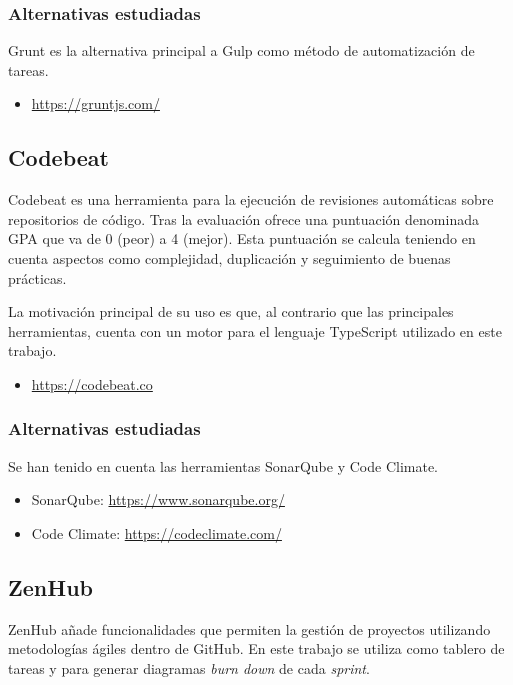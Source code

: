 \subsubsection{Alternativas estudiadas}

Grunt es la alternativa principal a Gulp como método de automatización de tareas.

\begin{itemize}
	\item \url{https://gruntjs.com/}
\end{itemize}

\subsection{Codebeat}

Codebeat es una herramienta para la ejecución de revisiones automáticas sobre repositorios de código. Tras la evaluación ofrece una puntuación denominada GPA que va de 0 (peor) a 4 (mejor). Esta puntuación se calcula teniendo en cuenta aspectos como complejidad, duplicación y seguimiento de buenas prácticas.

La motivación principal de su uso es que, al contrario que las principales herramientas, cuenta con un motor para el lenguaje TypeScript utilizado en este trabajo.

\begin{itemize}
	\item \url{https://codebeat.co}
\end{itemize}

\subsubsection{Alternativas estudiadas}

Se han tenido en cuenta las herramientas SonarQube y Code Climate.
\begin{itemize}
	\item SonarQube: \url{https://www.sonarqube.org/}
	\item Code Climate: \url{https://codeclimate.com/}
\end{itemize}

\subsection{ZenHub}

ZenHub añade funcionalidades que permiten la gestión de proyectos utilizando metodologías ágiles dentro de GitHub. En este trabajo se utiliza como tablero de tareas y para generar diagramas \emph{burn down} de cada \emph{sprint}.


